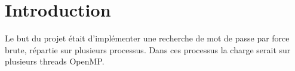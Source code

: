 \section{Introduction} %
\label{sec:introduction}
Le but du projet était d'implémenter une recherche de mot de passe par force brute, répartie sur plusieurs processus. Dans ces processus la charge serait sur plusieurs threads OpenMP.

